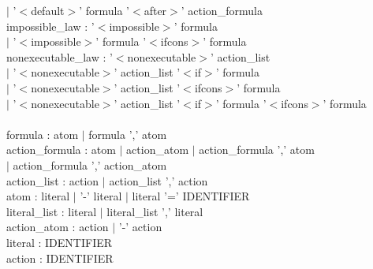 \documentclass[10pt,a4paper]{article}
\begin{document}
    \hspace*{1 cm}  $|$ '$<$default$>$' formula '$<$after$>$' action\_formula  \\
    impossible\_law : '$<$impossible$>$' formula \\
    \hspace*{1 cm} $|$ '$<$impossible$>$' formula '$<$ifcons$>$' formula\\
    nonexecutable\_law : '$<$nonexecutable$>$' action\_list   \\
    \hspace*{1 cm}  $|$ '$<$nonexecutable$>$' action\_list '$<$if$>$' formula \\
    \hspace*{1 cm}  $|$ '$<$nonexecutable$>$' action\_list '$<$ifcons$>$' formula \\
    \hspace*{1 cm}  $|$ '$<$nonexecutable$>$' action\_list '$<$if$>$' formula '$<$ifcons$>$' formula\\
    \\
    formula : atom $|$ formula ',' atom \\
    action\_formula : atom $|$ action\_atom $|$ action\_formula ',' atom \\
    \hspace*{1 cm} $|$ action\_formula ',' action\_atom \\
    action\_list : action $|$ action\_list ',' action \\
    atom : literal $|$ '-' literal $|$ literal '=' IDENTIFIER \\ %
    literal\_list : literal $|$ literal\_list ',' literal \\
    action\_atom : action $|$ '-' action \\
    literal : IDENTIFIER \\
    action : IDENTIFIER \\
    
\end{document}

